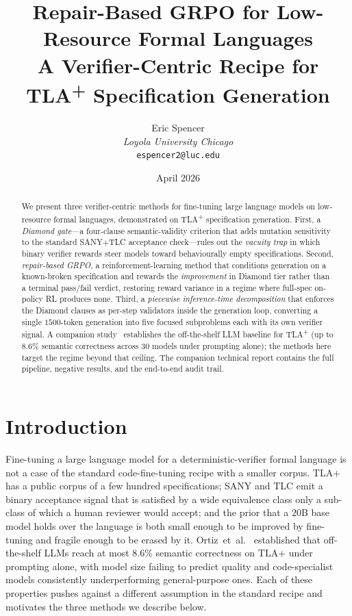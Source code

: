 \documentclass[11pt]{article}
\title{Repair-Based GRPO for Low-Resource Formal Languages\\
\large A Verifier-Centric Recipe for TLA\textsuperscript{+} Specification Generation}
\author{Eric Spencer\\
\small \textit{Loyola University Chicago}\\
\small \texttt{espencer2@luc.edu}}
\date{April 2026}
\begin{document}
\maketitle

\begin{abstract}
We present three verifier-centric methods for fine-tuning
large language models on low-resource formal languages,
demonstrated on TLA\textsuperscript{+} specification generation.
First, a \emph{Diamond gate}---a four-clause semantic-validity
criterion that adds mutation sensitivity to the standard SANY$+$TLC
acceptance check---rules out the \emph{vacuity trap} in which
binary verifier rewards steer models toward behaviourally empty
specifications. Second, \emph{repair-based GRPO}, a
reinforcement-learning method that conditions generation on a
known-broken specification and rewards the \emph{improvement} in
Diamond tier rather than a terminal pass/fail verdict, restoring
reward variance in a regime where full-spec on-policy RL produces
none. Third, a \emph{piecewise inference-time decomposition} that
enforces the Diamond clauses as per-step validators inside the
generation loop, converting a single $1500$-token generation into
five focused subproblems each with its own verifier signal.
A companion study~\cite{ortiz2026formallm} establishes the
off-the-shelf LLM baseline for TLA\textsuperscript{+}
(up to 8.6\% semantic correctness across 30 models under prompting
alone); the methods here target the regime beyond that ceiling.
The companion technical report contains the full pipeline,
negative results, and the end-to-end audit trail.
\end{abstract}

\section{Introduction}
\label{sec:intro}

Fine-tuning a large language model for a deterministic-verifier formal
language is not a case of the standard code-fine-tuning recipe with a
smaller corpus. TLA+~\cite{lamport2002specifying} has a public corpus
of a few hundred specifications; SANY and TLC emit a binary
acceptance signal that is satisfied by a wide equivalence class only a
sub-class of which a human reviewer would accept; and the prior that a
$20$B base model holds over the language is both small enough to be
improved by fine-tuning and fragile enough to be erased by it.
Ortiz~et~al.~\cite{ortiz2026formallm} established that off-the-shelf
LLMs reach at most $8.6\%$ semantic correctness on TLA+ under
prompting alone, with model size failing to predict quality and
code-specialist models consistently underperforming general-purpose
ones. Each of these properties pushes against a different assumption
in the standard recipe and motivates the three methods we describe
below.
\end{document}
